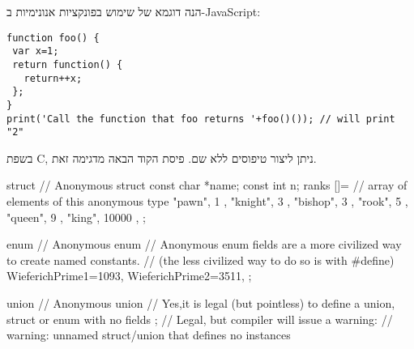 הנה דוגמא של שימוש בפונקציות אנונימיות ב-JavaScript:
\begin{verbatim}
function foo() {
 var x=1;
 return function() {
   return++x;
 };
}
print('Call the function that foo returns '+foo()()); // will print "2"
\end{verbatim}

      \begin{ציינון}
\item בשפת C, ניתן ליצור טיפוסים ללא שם. פיסת הקוד הבאה מדגימה זאת.
    \end{ציינון}
\begin{CPP}
struct { // Anonymous struct
 const char *name;
  const int n;
} ranks []={ // array of elements of this anonymous type
 { "pawn", 1 },
 { "knight", 3 },
 { "bishop", 3 },
 { "rook", 5 },
  { "queen", 9 },
  { "king", 10000 },
};
\end{CPP}

\begin{CPP}
enum { // Anonymous enum
 // Anonymous enum fields are a more civilized way to create named constants.
  // (the less civilized way to do so is with #define)
  WieferichPrime1=1093,
  WieferichPrime2=3511,
};
\end{CPP}

\begin{CPP}
union { // Anonymous union
  // Yes,it is legal (but pointless) to define a union, struct or enum with no fields
};
// Legal, but compiler will issue a warning:
// warning: unnamed struct/union that defines no instances
\end{CPP}

